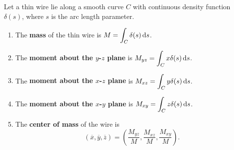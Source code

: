 \begin{definition}\label{def:mass_of_thin_wire}%
Let a thin wire lie along a smooth curve $C$ with continuous density function $\delta(s)$, where $s$ is the arc length parameter. 	%
\begin{enumerate}
	\item The \textbf{mass} of the thin wire is $\displaystyle M = \int_C \delta(s)\operatorname{d}\! s$.
	\item	The \textbf{moment about the $y$-$z$ plane} is $\displaystyle M_{yz} = \int_C x\delta(s)\operatorname{d}\! s$.
	
	\item	The \textbf{moment about the $x$-$z$ plane} is $\displaystyle M_{xz} = \int_C y\delta(s)\operatorname{d}\! s$.
	\item	The \textbf{moment about the $x$-$y$ plane} is $\displaystyle M_{xy} = \int_C z\delta(s)\operatorname{d}\! s$.
	\item The \textbf{center of mass} of the wire is
	\[
	(\overline{x},\overline{y},\overline{z})
	= \left(\frac{M_{yz}}M, \frac{M_{xz}}M,\frac{M_{xy}}M\right).
	\]
\end{enumerate}
\end{definition}

